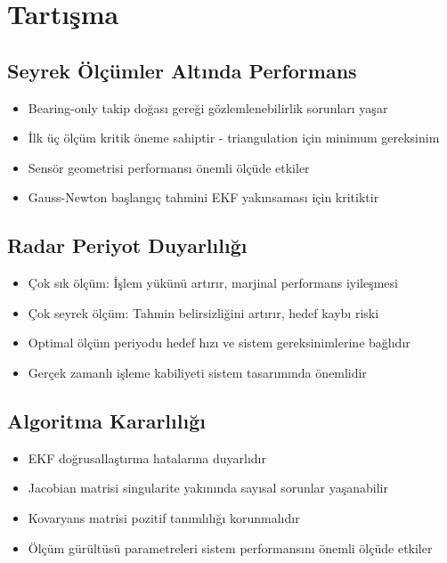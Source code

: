 \documentclass[12pt,a4paper]{article}
\begin{document}
\section{Tartışma}

\subsection{Seyrek Ölçümler Altında Performans}
\begin{itemize}
    \item Bearing-only takip doğası gereği gözlemlenebilirlik sorunları yaşar
    \item İlk üç ölçüm kritik öneme sahiptir - triangulation için minimum gereksinim
    \item Sensör geometrisi performansı önemli ölçüde etkiler
    \item Gauss-Newton başlangıç tahmini EKF yakınsaması için kritiktir
\end{itemize}

\subsection{Radar Periyot Duyarlılığı}
\begin{itemize}
    \item Çok sık ölçüm: İşlem yükünü artırır, marjinal performans iyileşmesi
    \item Çok seyrek ölçüm: Tahmin belirsizliğini artırır, hedef kaybı riski
    \item Optimal ölçüm periyodu hedef hızı ve sistem gereksinimlerine bağlıdır
    \item Gerçek zamanlı işleme kabiliyeti sistem tasarımında önemlidir
\end{itemize}

\subsection{Algoritma Kararlılığı}
\begin{itemize}
    \item EKF doğrusallaştırma hatalarına duyarlıdır
    \item Jacobian matrisi singularite yakınında sayısal sorunlar yaşanabilir
    \item Kovaryans matrisi pozitif tanımlılığı korunmalıdır
    \item Ölçüm gürültüsü parametreleri sistem performansını önemli ölçüde etkiler
\end{itemize}
\end{document}
